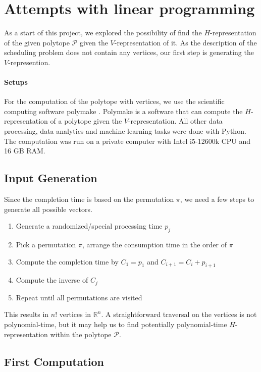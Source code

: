 \documentclass[12pt,letterpaper]{article}
\newcommand*{\R}{\mathbb{R}}
\newcommand{\Poly}{\mathcal{P}}
\begin{document}
\section{Attempts with linear programming}
As a start of this project, 
we explored the possibility of find the $H$-representation of the given polytope $\Poly$
given the $V$-representation of it. 
As the description of the scheduling problem does not contain any vertices, our first step is 
generating the $V$-represention. 

\paragraph{Setups}
For the computation of the polytope with vertices, we use the scientific computing software polymake \cite{assarf2017computing}.
Polymake is a software that can compute the $H$-representation of a polytope given the $V$-representation. 
All other data processing, data analytics and machine learning tasks were done with Python.
The computation was run on a private computer with Intel i5-12600k CPU and 16 GB RAM. 


\subsection{Input Generation}
Since the completion time is based on the permutation $\pi$, we need a few steps to generate all possible 
vectors. 
\begin{enumerate}
    \item Generate a randomized/special processing time $p_j$
    \item Pick a permutation $\pi$, arrange the consumption time in the order of $\pi$
    \item Compute the completion time by $C_1 = p_1$ and $C_{i+1} = C_i + p_{i+1}$
    \item Compute the inverse of $C_j$
    \item Repeat until all permutations are visited
\end{enumerate}
This results in $n!$ vertices in $\R^n$. A straightforward traversal on the vertices is not 
polynomial-time, but it may help us to find potentially polynomial-time $H$-representation within the polytope $\Poly$.

\subsection{First Computation}
\end{document}

